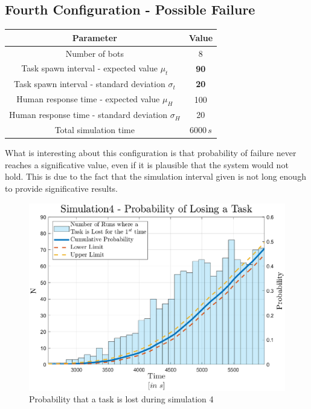 \documentclass{article}
\begin{document}
		\subsection{Fourth Configuration - Possible Failure}
			\begin{center}
				\begin{tabular}{ |c|c|}
					\hline
					Parameter & Value\\
					\hline
					\hline
					Number of bots & 8\\
					\hline
					Task spawn interval - expected value $\mu_t$ & \textbf{90}\\
					\hline					
					Task spawn interval - standard deviation $\sigma_t$ & \textbf{20}\\
					\hline
					Human response time - expected value $\mu_H$ & 100\\
					\hline					
					Human response time - standard deviation $\sigma_H$ & 20\\
					\hline
					Total simulation time & $6000\,s$\\
					\hline
				\end{tabular}
			\end{center}
			What is interesting about this configuration is that probability of failure never reaches a significative value, even if it is plausible that the system would not hold. This is due to the fact that the simulation interval given is not long enough to provide significative results.
			\begin{figure}[H]
				\centering
					\includegraphics[scale = 0.6]{Images/Simulation4}
					\caption{Probability that a task is lost during simulation 4}
					\label{fig:sim4}
			\end{figure}
	
\end{document}
